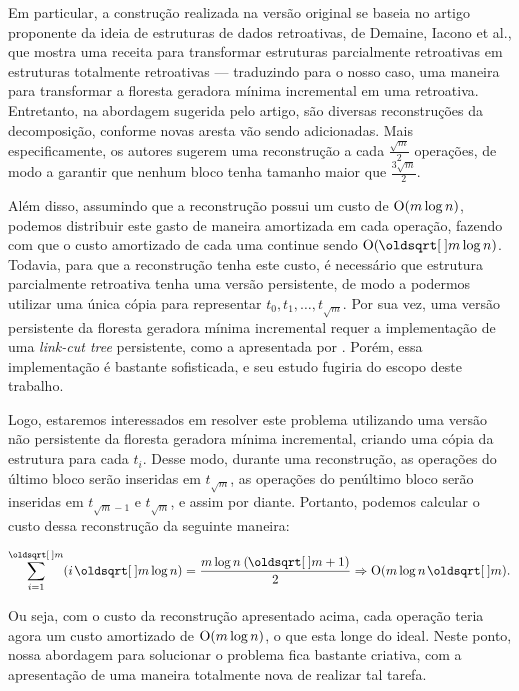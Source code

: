Em particular, a construção realizada na versão original se baseia no artigo proponente da ideia de estruturas de dados retroativas, de Demaine, Iacono et al., que mostra uma receita para transformar estruturas parcialmente retroativas em estruturas totalmente retroativas --- traduzindo para o nosso caso, uma maneira para transformar a floresta geradora mínima incremental em uma retroativa. Entretanto, na abordagem sugerida pelo artigo, são diversas reconstruções da decomposição, conforme novas aresta vão sendo adicionadas. Mais especificamente, os autores sugerem uma reconstrução a cada $\frac{\sqrt{m}}{2}$ operações, de modo a garantir que nenhum bloco tenha tamanho maior que $\frac{3\sqrt{m}}{2}$.

Além disso, assumindo que a reconstrução possui um custo de $\mathrm{O}(m \log n)$, podemos distribuir este gasto de maneira amortizada em cada operação, fazendo com que o custo amortizado de cada uma continue sendo $\Oh(\sqrt{m} \log n)$. Todavia, para que a reconstrução tenha este custo, é necessário que estrutura parcialmente retroativa tenha uma versão persistente, de modo a  podermos utilizar uma única cópia para representar $t_0, t_1, \dots, t_{\sqrt{m}}$. Por sua vez, uma versão persistente da floresta geradora mínima incremental requer a implementação de uma \emph{link-cut tree} persistente, como a apresentada por \citet{10.1007/978-3-540-69903-3_16}. Porém, essa implementação é bastante sofisticada, e seu estudo fugiria do escopo deste trabalho.

Logo, estaremos interessados em resolver este problema utilizando uma versão não persistente da floresta geradora mínima incremental, criando uma cópia da estrutura para cada $t_i$. Desse modo, durante uma reconstrução, as operações do último bloco serão inseridas em $t_{\sqrt{m}}$, as operações do penúltimo bloco serão inseridas em $t_{\sqrt{m} - 1}$ e $t_{\sqrt{m}}$, e assim por diante. Portanto, podemos calcular o custo dessa reconstrução da seguinte maneira:

\begin{equation}
    \sum_{i=1}^{\sqrt{m}} (i \sqrt{m} \log n) =
    \frac{m \log n \: (\sqrt{m} + 1)}{2} \Rightarrow
    \Oh(m \log n \sqrt{m}).
\end{equation}

Ou seja, com o custo da reconstrução apresentado acima, cada operação teria agora um custo amortizado de $\mathrm{O}(m \log n)$, o que esta longe do ideal. Neste ponto, nossa abordagem para solucionar o problema fica bastante criativa, com a apresentação de uma maneira totalmente nova de realizar tal tarefa.

